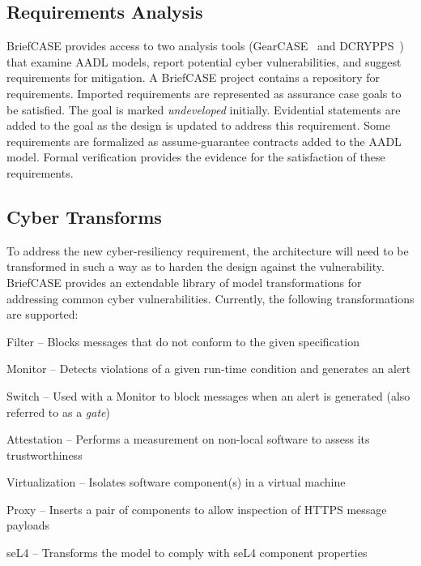 \subsection{Requirements Analysis}

BriefCASE provides access to two analysis tools (GearCASE~\cite{gearcase2020} and
DCRYPPS~\cite{dcrypps2019}) that examine AADL models, report potential cyber vulnerabilities,
and suggest requirements for mitigation.
%
A BriefCASE project contains a repository for requirements. Imported requirements are represented 
as assurance case goals to be satisfied. 
The goal is marked {\em undeveloped} initially.
Evidential statements are added to the goal as the design is updated to address this requirement.
Some requirements are formalized as assume-guarantee contracts added to the AADL model.
Formal verification provides the evidence for the satisfaction of these requirements.

\subsection{Cyber Transforms}

To address the new cyber-resiliency requirement, the architecture will need to be transformed in such a way as to harden the design against the vulnerability.
BriefCASE provides an extendable library of model transformations for addressing common cyber vulnerabilities.  Currently, the following transformations are supported:

\begin{compactitem}
	\item Filter -- Blocks messages that do not conform to the given specification
	\item Monitor -- Detects violations of a given run-time condition and generates an alert
	\item Switch -- Used with a Monitor to block messages when an alert is generated (also referred to as a \textit{gate})
	\item Attestation -- Performs a measurement on non-local software to assess its trustworthiness
	\item Virtualization -- Isolates software component(s) in a virtual machine
	\item Proxy -- Inserts a pair of components to allow inspection of %
		HTTPS message payloads
	\item seL4 -- Transforms the model to comply with seL4 component properties
\end{compactitem}  

